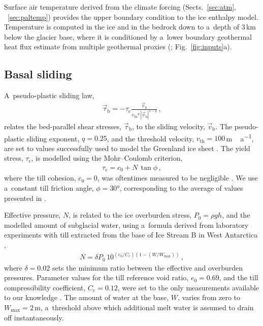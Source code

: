 \documentclass[tc, manuscript]{copernicus}
\begin{document}
    Surface air temperature derived from the climate forcing
    (Sects.~\ref{sec:atm}, ~\ref{sec:paltemp}) provides the upper boundary
    condition to the ice
    enthalpy model. Temperature is computed in the ice and in the bedrock down
    to a~depth of 3\,\unit{km} below the glacier base, where it is
    conditioned by a~lower boundary geothermal heat flux estimate from multiple
    geothermal proxies (\citealp[similarity method]{Goutorbe.etal.2011};
    Fig.~\ref{fig:inputs}a).


\subsection{Basal sliding}
\label{sec:sliding}

    A~pseudo-plastic sliding law,
    \begin{align}
      \vec{\tau}_{\mathrm{b}} = -\tau_{\mathrm{c}}
        \frac{\vec{v}_{\mathrm{b}}}
             {{v_{\text  {th}}}^q\,|\vec{v}_{\mathrm{b}}|^{1-q}} \,,
    \end{align}
    relates the bed-parallel shear stresses, $\vec{\tau}_{\mathrm{b}}$, to the
    sliding velocity, $\vec{v}_{\mathrm{b}}$. The pseudo-plastic sliding
    exponent, $q=0.25$, and the threshold velocity,
    $v_{\text{th}}=100$\,\unit{m\,a^{-1}}, are set to values successfully used
    to model the Greenland ice sheet \citep{Aschwanden.etal.2013}. The yield
    stress, $\tau_{\mathrm{c}}$, is modelled using the Mohr--Coulomb criterion,
    \begin{align}
      \tau_{\mathrm{c}} = c_0 + N\,\tan{\phi} \,,
    \end{align}
    where the till cohesion, $c_0=0$, was oftentimes measured to be
    negligible \citep[p.~268]{Tulaczyk.etal.2000, Cuffey.Paterson.2010}. We use
    a~constant till friction angle, $\phi=30$\unit{\degree}, corresponding to
    the average of values presented in \citet[p.~268]{Cuffey.Paterson.2010}.

    Effective pressure, $N$, is related to the ice overburden stress, $P_0=\rho
    gh$, and the modelled amount of subglacial water, using a~formula derived
    from laboratory experiments with till extracted from the base of Ice Stream
    B in West Antarctica \citep{Tulaczyk.etal.2000, Bueler.Pelt.2015},
    \begin{align}
      N = \delta P_0 \, 10^{(e_0/C_{\mathrm{c}}) (1 - (W/W_{\text{max}}))} \,,
    \end{align}
    where $\delta=0.02$ sets the minimum ratio between the effective and
    overburden pressures. Parameter values for the till reference void ratio,
    $e_0=0.69$, and the till compressibility coefficient,
    $C_{\mathrm{c}}=0.12$, were set to the only measurements available to our
    knowledge \citep{Tulaczyk.etal.2000}. The amount of water at the base, $W$,
    varies from zero to $W_{\text{max}}=2$\,m, a~threshold above which
    additional melt water is assumed to drain off instantaneously.
\end{document}
